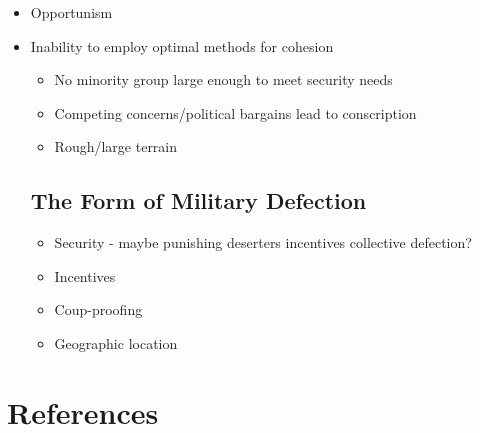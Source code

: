\documentclass[
  12pt,
]{article}
\providecommand{\tightlist}{%
  \setlength{\itemsep}{0pt}\setlength{\parskip}{0pt}}
\begin{document}
\begin{itemize}
\tightlist
\item
  Opportunism
\item
  Inability to employ optimal methods for cohesion

  \begin{itemize}
  \tightlist
  \item
    No minority group large enough to meet security needs
  \item
    Competing concerns/political bargains lead to conscription
  \item
    Rough/large terrain
  \end{itemize}

  \hypertarget{the-form-of-military-defection}{%
  \subsection{The Form of Military Defection}\label{the-form-of-military-defection}}

  \begin{itemize}
  \tightlist
  \item
    Security - maybe punishing deserters incentives collective defection?
  \item
    Incentives
  \item
    Coup-proofing
  \item
    Geographic location
  \end{itemize}
\end{itemize}

\hypertarget{references}{%
\section*{References}\label{references}}


\indent

\setlength{\parindent}{-0.2in}
\setlength{\leftskip}{0.2in}
\setlength{\parskip}{8pt}

\singlespacing
\end{document}
